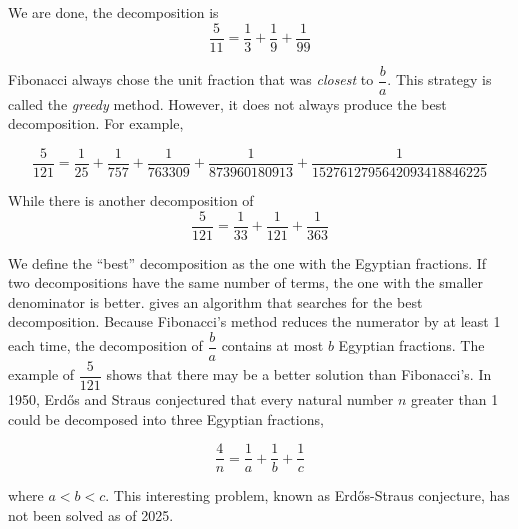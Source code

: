 \documentclass[b5paper]{article}
\begin{document}
We are done, the decomposition is
\[
\frac{5}{11} = \frac{1}{3} + \frac{1}{9} + \frac{1}{99}
\]

Fibonacci always chose the unit fraction that was \emph{closest} to $\dfrac{b}{a}$. This strategy is called the \emph{greedy} method. However, it does not always produce the best decomposition. For example,

\[
\frac{5}{121} = \frac{1}{25} + \frac{1}{757} + \frac{1}{763309} + \frac{1}{873960180913} + \frac{1}{1527612795642093418846225}
\]

While there is another decomposition of
\[
\frac{5}{121} = \frac{1}{33} + \frac{1}{121} + \frac{1}{363}
\]

We define the \enquote{best} decomposition as the one with the  Egyptian fractions. If two decompositions have the same number of terms, the one with the smaller denominator is better.  gives an algorithm that searches for the best decomposition. Because Fibonacci's method reduces the numerator by at least 1 each time, the decomposition of $\dfrac{b}{a}$ contains at most $b$ Egyptian fractions. The example of $\dfrac{5}{121}$ shows that there may be a better solution than Fibonacci's. In 1950, Erdős and Straus conjectured that every natural number $n$ greater than 1 could be decomposed into three Egyptian fractions, 

\[
\frac{4}{n} = \frac{1}{a} + \frac{1}{b} + \frac{1}{c}
\]

where $a < b < c$. This interesting problem, known as Erdős-Straus conjecture, has not been solved as of 2025.
\end{document}

